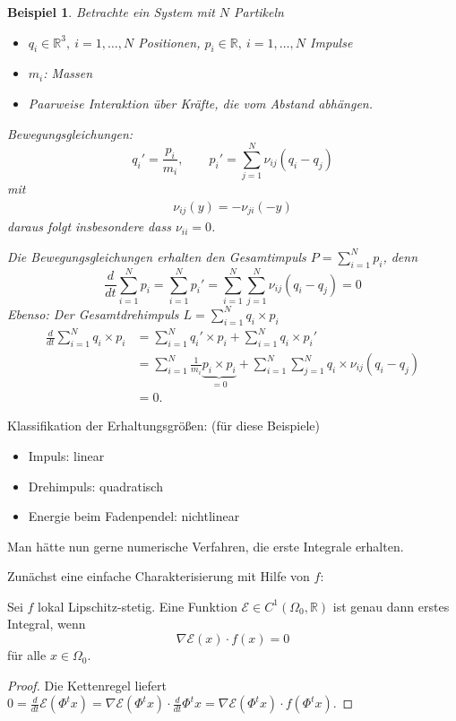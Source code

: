 \documentclass[german]{scrreprt}
\newcommand{\R}{\mathbb R}
\theoremstyle{plain}
\theoremstyle{nonumberplain}
\theoremstyle{nonumberplain}
\newtheorem{bsp}{Beispiel}
\theoremstyle{nonumberplain}
\newtheorem{proof}{Beweis}
\begin{document}
\begin{bsp}
	Betrachte ein System mit $N$ Partikeln
	\begin{itemize}
		\item $q_i\in\R^3,\ i=1,\hdots,N$ Positionen, $p_i\in\R,\ i=1,\hdots,N$ Impulse
		\item $m_i$: Massen
		\item Paarweise Interaktion über Kräfte, die vom Abstand abhängen.
	\end{itemize}
	Bewegungsgleichungen:
	\begin{equation*}
	q_i'=\frac{p_i}{m_i},\qquad p_i' = \sum_{j=1}^N \nu_{ij}(q_i-q_j)
	\end{equation*}
	mit
	\begin{align*}
	\nu_{ij}(y) = - \nu_{ji}(-y)
	\end{align*}
	daraus folgt insbesondere dass $\nu_{ii} = 0$.
	
	Die Bewegungsgleichungen erhalten den Gesamtimpuls $P=\sum_{i=1}^Np_i$, denn
	\begin{equation*}
	\frac{d}{dt}\sum_{i=1}^Np_i = \sum_{i=1}^N p_i' = \sum_{i=1}^N\sum_{j=1}^N\nu_{ij}(q_i-q_j) = 0
	\end{equation*}
	Ebenso: Der Gesamtdrehimpuls $L=\sum_{i=1}^N q_i\times p_i$
	\begin{align*}
	\frac{d}{dt}\sum_{i=1}^N q_i\times p_i
	& = \sum_{i=1}^N q_i'\times p_i+\sum_{i=1}^N q_i\times p_i' \\
	& = \sum_{i=1}^N \frac{1}{m_i}\underbrace{p_i\times p_i}_{=0} + \sum_{i=1}^N\sum_{j=1}^Nq_i\times\nu_{ij}(q_i-q_j) \\
	& = 0.
	\end{align*}
\end{bsp}

Klassifikation der Erhaltungsgrößen: (für diese Beispiele)
\begin{itemize}
	\item Impuls: linear
	\item Drehimpuls: quadratisch
	\item Energie beim Fadenpendel: nichtlinear
\end{itemize}

Man hätte nun gerne numerische Verfahren, die erste Integrale erhalten.

Zunächst eine einfache Charakterisierung mit Hilfe von $f$:

\begin{lemma}
	Sei $f$ lokal Lipschitz-stetig. Eine Funktion $\mathcal E\in C^1(\Omega_0,\R)$ ist genau dann erstes Integral, wenn
	\begin{equation*}
	\nabla\mathcal E(x)\cdot f(x) = 0
	\end{equation*}
	für alle $x\in\Omega_0$.
\end{lemma}
\begin{proof}
	Die Kettenregel liefert $\displaystyle 0 = \frac{d}{dt} \mathcal E(\Phi^t x) = \nabla\mathcal E(\Phi^tx)\cdot \frac{d}{dt}\Phi^tx = \nabla\mathcal E(\Phi^tx)\cdot f(\Phi^tx)$.
\end{proof}
\end{document}
